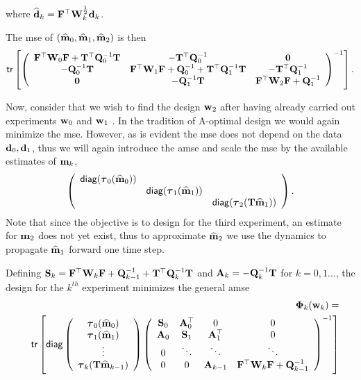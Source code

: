 \documentclass[11pt]{article}
\newcommand{\bfA}	{{\bf{A}}}
\newcommand{\bfF}	{{\bf{F}}}
\newcommand{\bfQ}	{{\bf{Q}}}
\newcommand{\bfS}	{{\bf{S}}}
\newcommand{\bfT}	{{\bf{T}}}
\newcommand{\bfW}	{{\bf{W}}}
\newcommand{\bfd}	{{\bf{d}}}
\newcommand{\bfm}	{{\bf{m}}}
\newcommand{\bfw}	{{\bf{w}}}
\newcommand{\hf}        {{\frac 12}}
\newcommand{\bfPhi}     {{\boldsymbol \Phi}}
\newcommand{\bftau}      {{\boldsymbol \tau}}
\newcommand {\zero}  { {\bf 0} }
\renewcommand{\hf}		 {\frac12}
\newcommand{\bfmhat}    {{\widehat{\bfm}}}
\newcommand{\bfdhat}    {{\widehat{\bfd}}}
\begin{document}
where $\bfdhat_k = \bfF^{\top}\bfW_k^{\hf}\bfd_k$. 

The {\sf mse} of $(\bfmhat_0,\bfmhat_1, \bfmhat_2)$ is then
\begin{equation*}
 {\sf tr}\left[\left(\begin{array}{ccc}\bfF^{\top}\bfW_0\bfF + \bfT^{\top}\bfQ^{-1}_0\bfT   & -\bfT^{\top}\bfQ^{-1}_0 & \zero\\
 -\bfQ^{-1}_0\bfT & \bfF^{\top}\bfW_1\bfF + \bfQ^{-1}_0 + \bfT^{\top}\bfQ^{-1}_1\bfT  & -\bfT^{\top}\bfQ^{-1}_1\\
 \zero & -\bfQ^{-1}_1\bfT & \bfF^{\top}\bfW_2\bfF + \bfQ^{-1}_1  
 \end{array}\right)^{-1}	\right]	.
\end{equation*}

 Now, consider that we wish to find the design $\bfw_2$ after having already carried out experiments $\bfw_0$ and  $\bfw_1$ . In the tradition of A-optimal design we would again minimize the {\sf mse}. However, as is evident  the {\sf mse} does not depend on the data $\bfd_0, \bfd_1$, thus we will again introduce the {\sf amse} and scale the {\sf mse} by the available estimates of $\bfm_{k}$, 
\begin{equation*}
 \left( \begin{array}{ccc}{\sf diag}(\bftau_0(\bfmhat_0))& & \\
  & {\sf diag}(\bftau_1(\bfmhat_1))& 
  \\& & {\sf diag}(\bftau_2(\bfT\bfmhat_1))
  \end{array}\right).
\end{equation*}
Note that since the objective is to design for the third experiment, an estimate for $\bfm_2$ does not yet exist, thus to approximate $\bfmhat_2$ we use the dynamics to propagate $\bfmhat_1$ forward one time step.

Defining $\bfS_k = \bfF^{\top}\bfW_{k}\bfF + \bfQ^{-1}_{k-1} + \bfT^{\top}\bfQ^{-1}_{k}\bfT$  and $\bfA_k = -\bfQ^{-1}_k \bfT$ for $k = 0,1...$, the design for the $k^{th}$ experiment minimizes  the  general {\sf amse} 
\begin{eqnarray}
\label{eq:noisyPhi}
&&\bfPhi_k(\bfw_k) =\\ 
\nonumber
&&{\sf tr} \left[{\sf diag}\left( \begin{array}{c}
\bftau_0(\bfmhat_0) \\ 
\bftau_1(\bfmhat_1)  \\
\vdots \\
\bftau_k(\bfT\bfmhat_{k-1})\end{array}\right)
\left(\begin{array}{cccc}
  \bfS_0  &  \bfA^{\top}_0 & 0 & 0\\
 \bfA_0 & \bfS_1 & \bfA^{\top}_1 & 0 \\
 0 & \ddots & \ddots & \ddots \\
0 & 0 & \bfA_{k-1} &  \bfF^{\top}\bfW_{k}\bfF + \bfQ^{-1}_{k-1} 
  \end{array}\right)^{-1}\right]
\end{eqnarray}
  
\end{document}
